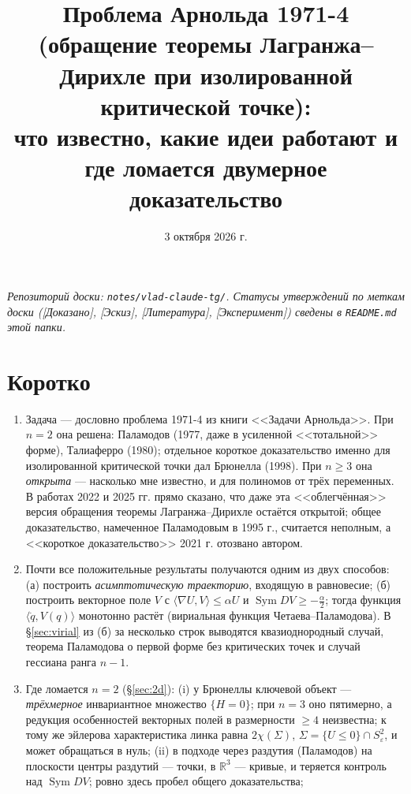 \documentclass[11pt,a4paper]{article}
\title{Проблема Арнольда 1971-4\\[3pt]
\large (обращение теоремы Лагранжа--Дирихле при изолированной критической точке):\\
что известно, какие идеи работают и где ломается двумерное доказательство}
\author{}
\date{3 октября 2026 г.}
\theoremstyle{definition}
\newcommand{\R}{\mathbb R}
\newcommand{\eps}{\varepsilon}
\DeclareMathOperator{\Sym}{Sym}
\begin{document}
\maketitle
\vspace{-8mm}
\noindent\emph{Репозиторий доски: \nolinkurl{notes/vlad-claude-tg/}. Статусы утверждений по меткам доски
([Доказано], [Эскиз], [Литература], [Эксперимент]) сведены в \texttt{README.md} этой папки.}
\vspace{2mm}
\tableofcontents

\section*{Коротко}
\begin{enumerate}[leftmargin=*]
\item Задача --- дословно проблема 1971-4 из книги <<Задачи Арнольда>>. При $n=2$ она решена:
Паламодов (1977, даже в усиленной <<тотальной>> форме), Талиаферро (1980); отдельное короткое
доказательство именно для изолированной критической точки дал Брюнелла (1998).
При $n\ge 3$ она \emph{открыта} --- насколько мне известно, и для полиномов от трёх переменных.
В работах 2022 и 2025 гг. прямо сказано, что даже эта <<облегчённая>> версия обращения
теоремы Лагранжа--Дирихле остаётся открытой; общее доказательство, намеченное Паламодовым в 1995 г.,
считается неполным, а <<короткое доказательство>> 2021 г. отозвано автором.
\item Почти все положительные результаты получаются одним из двух способов:
(а) построить \emph{асимптотическую траекторию}, входящую в равновесие;
(б) построить векторное поле $V$ с $\langle\nabla U,V\rangle\le\alpha U$ и $\Sym DV\ge-\frac\alpha2$;
тогда функция $\langle\dot q,V(q)\rangle$ монотонно растёт (вириальная функция Четаева--Паламодова).
В \S\ref{sec:virial} из (б) за несколько строк выводятся квазиоднородный случай, теорема Паламодова
о первой форме без критических точек и случай гессиана ранга $n-1$.
\item Где ломается $n=2$ (\S\ref{sec:2d}):
(i) у Брюнеллы ключевой объект --- \emph{трёхмерное} инвариантное множество $\{H=0\}$;
при $n=3$ оно пятимерно, а редукция особенностей векторных полей в размерности $\ge4$ неизвестна;
к тому же эйлерова характеристика линка равна $2\chi(\Sigma)$, $\Sigma=\{U\le0\}\cap S^2_\eps$,
и может обращаться в нуль;
(ii) в подходе через раздутия (Паламодов) на плоскости центры раздутий --- точки, в $\R^3$ --- кривые,
и теряется контроль над $\Sym DV$; ровно здесь пробел общего доказательства;

\end{enumerate}
\end{document}
